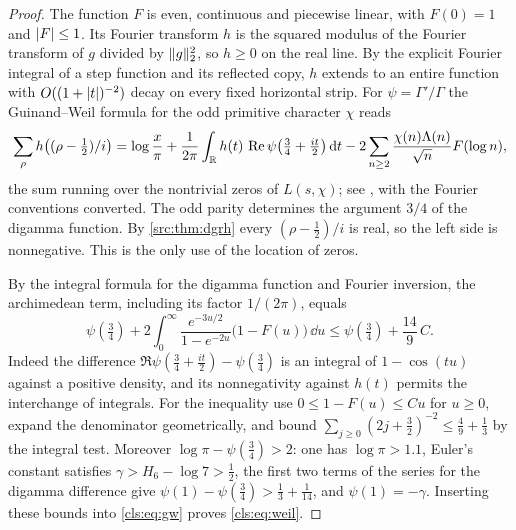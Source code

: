 \begin{proof}
The function $F$ is even, continuous and piecewise linear, with $F(0)=1$ and $\lvert F\rvert\le1$.
Its Fourier transform $h$ is the squared modulus of the Fourier transform of $g$ divided
by $\lVert g\rVert_2^2$, so $h\ge0$ on the real line. By the explicit Fourier integral of a step
function and its reflected copy, $h$ extends to an entire function with
$O((1+\lvert t\rvert)^{-2})$ decay on every fixed horizontal strip. For $\psi=\Gamma'/\Gamma$ the
Guinand--Weil formula for the odd primitive character $\chi$ reads
\begin{equation}\label{cls:eq:gw}
 \sum_{\rho}h\bigl((\rho-\tfrac12)/i\bigr)=
 \log\frac{x}{\pi}+\frac{1}{2\pi}\int_{\mathbb{R}}h(t)\,\operatorname{Re}\psi\bigl(\tfrac34+\tfrac{it}2\bigr)\,\mathrm{d} t
 -2\sum_{n\ge2}\frac{\chi(n)\Lambda(n)}{\sqrt n}F(\log n),
\end{equation}
the sum running over the nontrivial zeros of $L(s,\chi)$; see
\cite[Lemma~9]{Carneiro2024Fourier}, with the Fourier conventions converted. The odd parity
determines the argument $3/4$ of the digamma function. By \cref{src:thm:dgrh} every
$(\rho-\tfrac12)/i$ is real, so the left side is nonnegative. This is the only use of the
location of zeros.

By the integral formula for the digamma function and Fourier inversion, the archimedean
term, including its factor $1/(2\pi)$, equals
\[
 \psi(\tfrac34)+2\int_0^\infty\frac{e^{-3u/2}}{1-e^{-2u}}\bigl(1-F(u)\bigr)\,\dd u
 \le\psi(\tfrac34)+\frac{14}{9}\,C .
\]
Indeed the difference $\Re\psi(\tfrac34+\tfrac{it}2)-\psi(\tfrac34)$ is an integral of
$1-\cos(tu)$ against a positive density, and its nonnegativity against $h(t)$ permits the
interchange of integrals. For the inequality use $0\le1-F(u)\le Cu$ for $u\ge0$, expand the
denominator geometrically, and bound
$\sum_{j\ge0}(2j+\tfrac32)^{-2}\le\tfrac49+\tfrac13$ by the integral test. Moreover
$\log\pi-\psi(\tfrac34)>2$: one has $\log\pi>1.1$, Euler's constant satisfies
$\gamma>H_6-\log7>\tfrac12$, the first two terms of the series for the digamma difference
give $\psi(1)-\psi(\tfrac34)>\tfrac13+\tfrac1{14}$, and $\psi(1)=-\gamma$. Inserting these
bounds into \eqref{cls:eq:gw} proves \eqref{cls:eq:weil}.
\end{proof}

